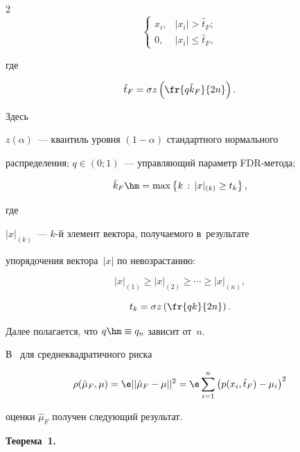 \begin{multicols}{2}
\begin{equation*}
 \begin{cases}

   x_i, & |x_i| > \hat{t}_F;\\

   0, & |x_i| \leq \hat{t}_F,

 \end{cases}

\end{equation*}

где

$$

\hat{t}_F = \sigma z\left(\fr{q \hat{k}_F}{2n}\right).

$$

Здесь

$z(\alpha)$~--- квантиль уровня $(1-\alpha)$ стандартного нормального 

распределения; $q\in(0;1)$~--- управ\-ля\-ющий па\-ра\-метр FDR-ме\-то\-да;

$$

\hat{k}_F \hm= \max \left\{k \, :\, |x|_{(k)} \geq t_k \right\}, 

$$

где

$|x|_{(k)}$~--- $k$-й элемент вектора, получаемого в~результате 

упорядочения вектора~$|x|$ по невозрастанию:

$$

|x|_{(1)} \geq |x|_{(2)} \geq \cdots \geq |x|_{(n)},

$$

$$

 t_k = \sigma z\left(\fr{q  k}{2n}\right).

$$

 Далее полагается, что $q\hm\equiv q_n$ зависит от~$n$.



В~\cite{AdaptingFDR} для среднеквадратичного риска

$$

\rho(\hat{\mu}_F, \mu) = \e ||\hat{\mu}_F-\mu||^2 = \e\sum\limits_{i=1}^n 

\left(p(x_i,\hat{t}_F)-\mu_i\right)^2

$$

оценки $\hat{\mu}_F$ получен сле\-ду\-ющий результат.





\smallskip



\noindent

\textbf{Теорема~1.}


\end{multicols}
